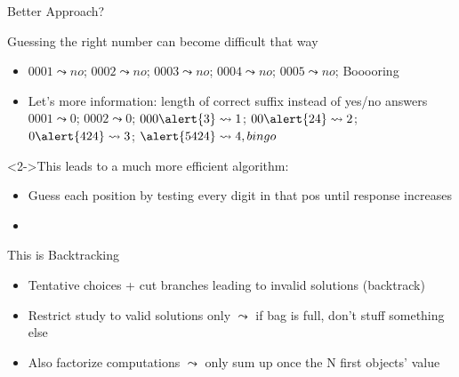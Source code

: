 \begin{frame}{Better Approach?}
  \begin{block}{Guessing the right number can become difficult that way}
    \begin{itemize}
    \item 
      $0001 \leadsto no$; $0002 \leadsto no$; $0003 \leadsto no$; 
      $0004 \leadsto no$; $0005 \leadsto no$; Booooring
    \item Let's more information: length of correct suffix instead of yes/no answers\\
      $0001 \leadsto 0$; $0002 \leadsto 0$; $000\alert{3} \leadsto 1$;
      $00\alert{24} \leadsto 2$; $0\alert{424} \leadsto 3$; $\alert{5424} \leadsto 4, bingo$
    \end{itemize}   
  \end{block}\vspace{-.6\baselineskip}
  \begin{block}<2->{This leads to a much more efficient algorithm:}
    \begin{itemize}
    \item Guess each position by testing every digit in that pos until response
      increases
    \item {}
    \end{itemize}
  \end{block}\vspace{-.6\baselineskip}

  \begin{block}{This is Backtracking}
    \begin{itemize}\vspace{-.4\baselineskip}
    \item Tentative choices + cut branches leading to invalid solutions (backtrack)
    \item Restrict study to valid solutions only
      {\small $\leadsto$ if bag is full, don't stuff something else}\\
    \item Also factorize computations
      {\small $\leadsto$ only sum up once the N first objects' value}
    \end{itemize}    
  \end{block}
\end{frame}
